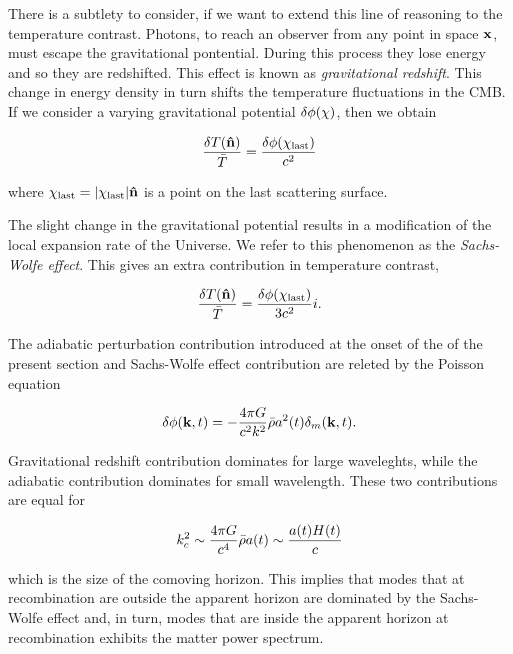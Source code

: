 There is a subtlety to consider, if we want to extend this line of reasoning
to the temperature contrast. Photons, to reach an observer from any point
in space $\vb{x}$, must escape the gravitational pontential. During this
process they lose energy and so they are redshifted. This effect is known
as \emph{gravitational redshift}. This change in energy density in turn
shifts the temperature fluctuations in the CMB. If we consider a varying
gravitational potential $\delta \phi\qty(\vb{\chi})$, then we obtain

\begin{equation}
        \frac{\var{T\qty(\vu{n})}}{\bar T} =
        \frac{\var{\phi\qty(\vb{\chi}_\text{last})}}{c^2}
\end{equation}

where $\vb{\chi}_\text{last} = \abs{\vb{\chi}_\text{last}} \vu{n}$ is a
point on the last scattering surface.

The slight change in the gravitational potential results in a modification
of the local expansion rate of the Universe. We refer to this phenomenon as
the \emph{Sachs-Wolfe effect}. This gives an extra contribution in
temperature contrast,

\begin{equation}
        \frac{\var{T\qty(\vu{n})}}{\bar T} =
        \frac{\var{\phi\qty(\vb{\chi}_\text{last})}}{3c^2}i.
\end{equation}

The adiabatic perturbation contribution introduced at the onset of the of
the present section and Sachs-Wolfe effect contribution are releted by the
Poisson equation

\begin{equation}
        \var{\phi\qty(\vb{k},t)} = -\frac{4\pi G}{c^2 k^2}
        \bar \rho a^2\qty(t) \delta_m\qty(\vb{k},t).
\end{equation}

Gravitational redshift contribution dominates for large waveleghts, while
the adiabatic contribution dominates for small wavelength. These two
contributions are equal for

\begin{equation}
        k^2_c \sim \frac{4\pi G}{c^4}\bar \rho a\qty(t) \sim
        \frac{a\qty(t)H\qty(t)}{c}
\end{equation}

which is the size of the comoving horizon. This implies that modes that at
recombination are outside the apparent horizon are dominated by the
Sachs-Wolfe effect and, in turn, modes that are inside the apparent horizon
at recombination exhibits the matter power spectrum.

